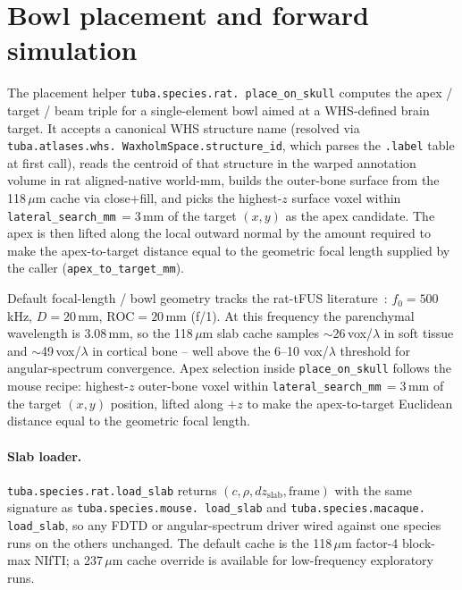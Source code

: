 \documentclass{compactarticle}
\begin{document}
\section{Bowl placement and forward simulation}
\label{sec:placement}

The placement helper \texttt{tuba.species.\allowbreak rat.\allowbreak
place\_on\_skull} computes the apex / target / beam triple for a
single-element bowl aimed at a WHS-defined brain target. It accepts a
canonical WHS structure name (resolved via
\texttt{tuba.\allowbreak atlases.\allowbreak whs.\allowbreak
WaxholmSpace.\allowbreak structure\_id}, which parses the
\texttt{.label} table at first call), reads the centroid of that
structure in the warped annotation volume in rat
aligned-native world-mm, builds the outer-bone surface from the
118\,$\mu$m cache via close+fill, and picks the highest-$z$ surface
voxel within \texttt{lateral\_search\_mm}\,$=3$\,mm of the target
$(x, y)$ as the apex candidate. The apex is then lifted along the
local outward normal by the amount required to make the
apex-to-target distance equal to the geometric focal length supplied
by the caller (\texttt{apex\_to\_target\_mm}).

Default focal-length / bowl geometry tracks the rat-tFUS
literature~\cite{rat-cc-tFUS,rat-stim-strialum}: $f_0 = 500$\,kHz,
$D = 20$\,mm, $\mathrm{ROC} = 20$\,mm (f/1). At this frequency the
parenchymal wavelength is 3.08\,mm, so the 118\,$\mu$m slab cache
samples $\sim$26\,vox/$\lambda$ in soft tissue and $\sim$49\,vox/$\lambda$
in cortical bone -- well above the 6--10 vox/$\lambda$ threshold for
angular-spectrum convergence. Apex selection inside
\texttt{place\_on\_skull} follows the mouse recipe: highest-$z$
outer-bone voxel within \texttt{lateral\_search\_mm}\,$=3$\,mm of
the target $(x, y)$ position, lifted along $+z$ to make the
apex-to-target Euclidean distance equal to the geometric focal
length.

\paragraph{Slab loader.}
\texttt{tuba.species.rat.\allowbreak load\_slab} returns
$(c, \rho, dz_{\mathrm{slab}}, \mathrm{frame})$ with the same
signature as \texttt{tuba.species.\allowbreak mouse.\allowbreak
load\_slab} and \texttt{tuba.species.\allowbreak macaque.\allowbreak
load\_slab}, so any FDTD or angular-spectrum driver wired against
one species runs on the others unchanged. The default cache is the
118\,$\mu$m factor-4 block-max NIfTI; a 237\,$\mu$m cache override is
available for low-frequency exploratory runs.
\end{document}
